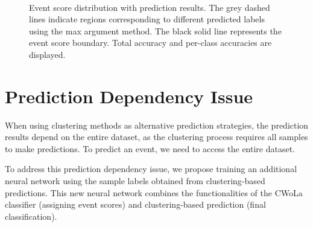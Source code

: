 \documentclass[12pt]{article}
\begin{document}
\begin{figure}[htpb]
{            } \\  
            \caption{Event score distribution with prediction results. The grey dashed lines indicate regions corresponding to different predicted labels using the max argument method. The black solid line represents the event score boundary. Total accuracy and per-class accuracies are displayed.}  
            \label{fig:event_score_distribution_w_prediction_ambiguous_train_test_comparison}  
        \end{figure}
\section{Prediction Dependency Issue}  
\label{sec:prediction_dependency_issue}  

	When using clustering methods as alternative prediction strategies, the prediction results depend on the entire dataset, as the clustering process requires all samples to make predictions. To predict an event, we need to access the entire dataset.

	To address this prediction dependency issue, we propose training an additional neural network using the sample labels obtained from clustering-based predictions. This new neural network combines the functionalities of the CWoLa classifier (assigning event scores) and clustering-based prediction (final classification).
\end{document}
